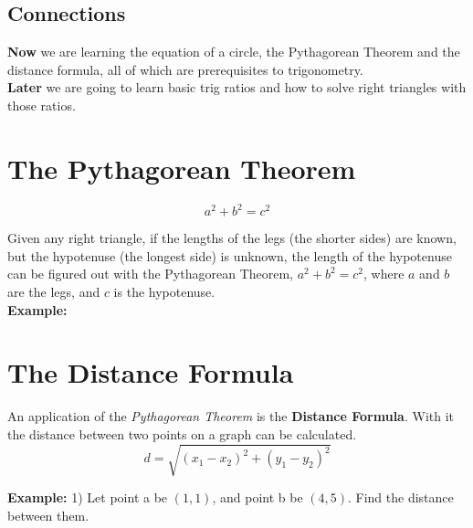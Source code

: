 \documentclass[12pt]{article}
\begin{document}
\subsection*{Connections}

\textbf{Now} we are learning the equation of a circle, the Pythagorean Theorem and the distance formula, all of which are prerequisites to trigonometry.\\

\textbf{Later} we are going to learn basic trig ratios and how to solve right triangles with those ratios.\\

\let\stdsection\section
\renewcommand\section{\newpage\stdsection}

\section*{The Pythagorean Theorem}

$$a^2+b^2=c^2$$

Given any right triangle, if the lengths of the legs (the shorter sides) are known, but the hypotenuse (the longest side) is unknown, the length of the hypotenuse can be figured out with the Pythagorean Theorem, $a^2+b^2=c^2$, where $a$ and $b$ are the legs, and $c$ is the hypotenuse.\\

\textbf{Example:} 

\pagebreak

\section*{The Distance Formula}

An application of the \textit{Pythagorean Theorem} is the \textbf{Distance Formula}. With it the distance between two points on a graph can be calculated.\\

$$d=\sqrt{(x_1-x_2)^{2}+(y_1-y_2)^{2}}$$

\textbf{Example:} 1) Let point a be $(1,1)$, and point b be $(4,5)$. Find the distance between them.\\

\newcommand{\graph}{
\begin{tikzpicture}[scale=0.3]
   \tkzInit[xmax=10,ymax=10,xmin=-10,ymin=-10]
   \tkzGrid
   \tkzAxeXY
   
  \end{tikzpicture}
  }
  
\end{document}
